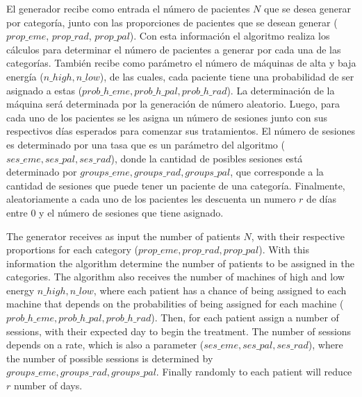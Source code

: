 El generador recibe como entrada el n\'umero de pacientes $N$ que se desea generar por categor\'ia, junto con las proporciones de pacientes que se desean generar ($prop\_eme$, $prop\_rad$, $prop\_pal$). Con esta informaci\'on el algoritmo realiza los c\'alculos para determinar el n\'umero de pacientes a generar por cada una de las categor\'ias. Tambi\'en recibe como par\'ametro el n\'umero de m\'aquinas de alta y baja energ\'ia ($n\_high, n\_low$), de las cuales, cada paciente tiene una probabilidad de ser asignado a estas ($prob\_h\_eme, prob\_h\_pal, prob\_h\_rad$). La determinaci\'on de la m\'aquina ser\'a determinada por la generaci\'on de n\'umero aleatorio. Luego, para cada uno de los pacientes se les asigna un n\'umero de sesiones junto con sus respectivos d\'ias esperados para comenzar sus tratamientos. El n\'umero de sesiones es determinado por una tasa que es un par\'ametro del algoritmo ($ses\_eme, ses\_pal, ses\_rad$), donde la cantidad de posibles sesiones est\'a determinado por $groups\_eme, groups\_rad, groups\_pal$, que corresponde a la cantidad de sesiones que puede tener un paciente de una categor\'ia. Finalmente, aleatoriamente a cada uno de los pacientes les descuenta un numero $r$ de d\'ias entre $0$ y el n\'umero de sesiones que tiene asignado.

The generator receives as input the number of patients $N$, with their respective proportions for each category ($ prop\_eme, prop\_rad, prop\_pal $). With this information the algorithm determine the number of patients to be assigned in the categories. The algorithm also receives the number of machines of high and low energy $n\_high, n\_low $, where each patient has a chance of being assigned to each machine that depends on the probabilities of being assigned for each machine ($prob\_h\_eme, prob\_h\_pal, prob\_h\_rad$). Then, for each patient assign a number of sessions, with their expected day to begin the treatment. The number of sessions depends on a rate, which is also a parameter ($ses\_eme, ses\_pal, ses\_rad$), where the number of possible sessions is determined by $groups\_eme, groups\_rad, groups\_pal$. Finally randomly to each patient will reduce $r$ number of days.

